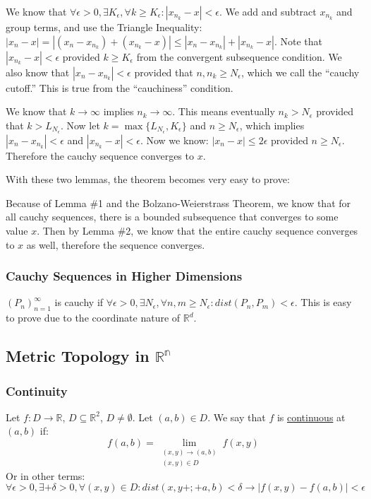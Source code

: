 \documentclass[11 pt, twoside]{article}
\begin{document}
We know that $\forall \epsilon > 0, \exists K_\epsilon, \forall k \geq
K_\epsilon: |x_{n_k} - x| < \epsilon$. We add and subtract $x_{n_k}$ and
group terms, and use the Triangle Inequality: $|x_n - x| = |(x_n - x_{n_k}) + (x_{n_k} - x)| \leq
|x_n - x_{n_k}| + |x_{n_k} - x|$. Note that $|x_{n_k} - x| < \epsilon$
provided $k \geq K_{\epsilon}$ from the convergent subsequence condition. We
also know that $|x_n - x_{n_k}| < \epsilon$ provided that $n, n_k \geq
N_{\epsilon}$, which we call the ``cauchy cutoff.'' This is true from the
``cauchiness'' condition.

We know that $k\to\infty$ implies $n_k \to \infty$. This means eventually
$n_k > N_\epsilon$ provided that $k > L_{N_\epsilon}$. Now let $k =
\max\{L_{N_\epsilon}, K_\epsilon\}$ and $n \geq N_\epsilon$, which
implies $|x_n - x_{n_k}| < \epsilon$ and $|x_{n_k} - x| < \epsilon$.
Now we know: $|x_n - x| \leq 2\epsilon$ provided $n \geq N_{\epsilon}$.
Therefore the cauchy sequence converges to $x$.

\vspace{0.3cm}

With these two lemmas, the theorem becomes very easy to prove:

Because of Lemma \#1 and the Bolzano-Weierstrass Theorem, we know that for all
cauchy sequences, there is a bounded subsequence that converges to some value
$x$. Then by Lemma \#2, we know that the entire cauchy sequence converges to $x$
as well, therefore the sequence converges. 

\subsubsection{Cauchy Sequences in Higher Dimensions}

$(P_n)_{n=1}^\infty$ is cauchy if $\forall \epsilon > 0, \exists N_\epsilon, \forall n, m \geq N_\epsilon: dist(P_n, P_m) < \epsilon$.
This is easy to prove due to the coordinate nature of $\mathbb{R}^d$.

\subsection{Metric Topology in $\mathbb{R^n}$}
\subsubsection{Continuity}
Let $f: D\to\mathbb{R}$, $D\subseteq\mathbb{R}^2$, $D\neq\emptyset$. Let $(a, b)\in D$. We say that $f$ is \underline{continuous} at $(a, b)$ if:
$$f(a, b) = \lim_{\substack{(x, y)\to(a,b)\\(x, y)\in D}} f(x, y)$$
Or in other terms:
$$\forall \epsilon > 0, \exists+ \delta>0, \forall (x, y)\in D: dist(x,
y+;+a,b) < \delta \to |f(x,y) - f(a,b)| < \epsilon$$
\end{document}

